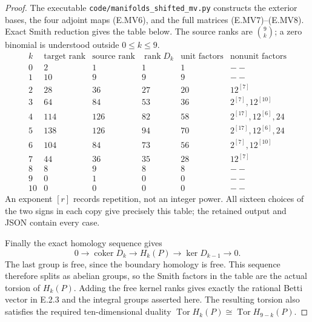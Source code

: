 \begin{proof}
The executable \texttt{code/manifolds\_shifted\_mv.py} constructs
the exterior bases, the four adjoint maps (E.MV6), and the full
matrices (E.MV7)--(E.MV8). Exact Smith reduction gives the table
below. The source ranks are $\binom9k$; a zero binomial is
understood outside $0\leq k\leq9$.
\[
 \begin{array}{c|rrrr|l}
 k&\text{target rank}&\text{source rank}&\operatorname{rank}D_k&
       \text{unit factors}&\text{nonunit factors}\\\hline
 0&2&1&1&1&--\\
 1&10&9&9&9&--\\
 2&28&36&27&20&12^{[7]}\\
 3&64&84&53&36&2^{[7]},12^{[10]}\\
 4&114&126&82&58&2^{[17]},12^{[6]},24\\
 5&138&126&94&70&2^{[17]},12^{[6]},24\\
 6&104&84&73&56&2^{[7]},12^{[10]}\\
 7&44&36&35&28&12^{[7]}\\
 8&8&9&8&8&--\\
 9&0&1&0&0&--\\
 10&0&0&0&0&--
 \end{array}
\]
An exponent $[r]$ records repetition, not an integer power.
All sixteen choices of the two signs in each copy give precisely
this table; the retained output and JSON contain every case.

Finally the exact homology sequence gives
\[
 0\longrightarrow\operatorname{coker}D_k
 \longrightarrow H_k(P)
 \longrightarrow\ker D_{k-1}\longrightarrow0.
\]
The last group is free, since the boundary homology is free.
This sequence therefore splits as abelian groups, so the Smith
factors in the table are the actual torsion of $H_k(P)$.
Adding the free kernel ranks gives exactly the rational Betti
vector in E.2.3 and the integral groups asserted here.
The resulting torsion also satisfies the required ten-dimensional
duality $\operatorname{Tor}H_k(P)\cong
\operatorname{Tor}H_{9-k}(P)$.
\end{proof}

